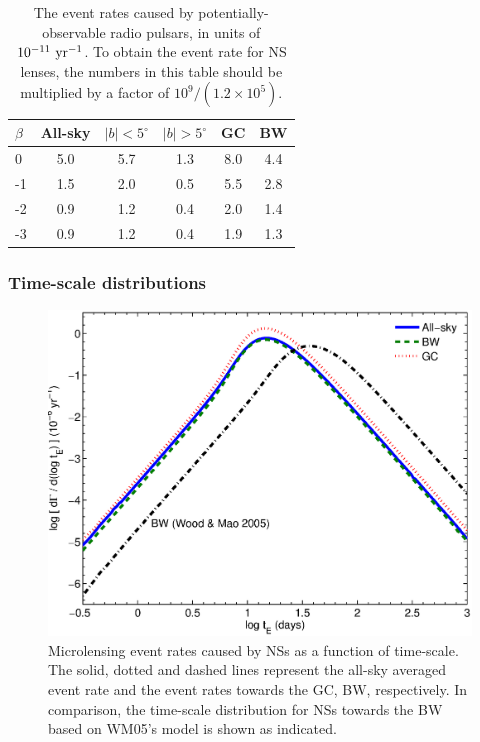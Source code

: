 \documentclass[iop,apj]{emulateapj}
\begin{document}
\begin{table}
\begin{center}
\caption{The event rates caused by potentially-observable radio
pulsars, in units of $10^{-11}\ \rm{yr^{-1}}$. To obtain the event
rate for NS lenses, the numbers in this table should be multiplied by
a factor of $10^9/\left(1.2\times10^5\right)$.}
\label{eventRate}
\begin{tabular}{lccccc}
\hline
    $\beta$    &      All-sky  &   $\mid b\mid<5^{\circ}$  & $\mid b\mid>5^{\circ}$  & GC  &  BW        \\
\hline
      0        &      5.0      &    5.7    &  1.3  &  8.0 & 4.4   \\
      -1       &      1.5      &    2.0    &  0.5  &  5.5 & 2.8   \\
      -2       &      0.9      &    1.2    &  0.4  &  2.0 & 1.4   \\
      -3       &      0.9      &    1.2    &  0.4  &  1.9 & 1.3   \\
\hline
\end{tabular}
\end{center}
\end{table}

\subsubsection{Time-scale distributions}

\begin{figure}
\begin{center}
  \includegraphics[width=3.5 in]{timescale.eps}
%
\caption{Microlensing event rates caused by NSs as a function of time-scale.
The solid, dotted and dashed lines represent the all-sky averaged event rate and the
event rates towards the GC, BW, respectively. In comparison, the time-scale distribution
for NSs towards the BW based on WM05's model is shown as indicated.
}
\label{timescale}
\end{center}
\end{figure}
\end{document}
